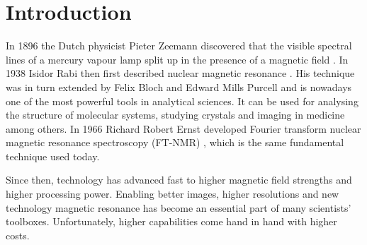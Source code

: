 \setchapterpreamble[u]{\margintoc}
\chapter{Introduction}


In 1896 the Dutch physicist Pieter Zeemann discovered that the visible spectral lines of a mercury vapour lamp split up in the presence of a magnetic field . In 1938 Isidor Rabi then first described nuclear magnetic resonance . His technique was in turn extended by Felix Bloch  and Edward Mills Purcell  and is nowadays one of the most powerful tools in analytical sciences. It can be used for analysing the structure of molecular systems, studying crystals and imaging in medicine among others. In 1966 Richard Robert Ernst developed Fourier transform nuclear magnetic resonance spectroscopy (FT-NMR) , which is the same fundamental technique used today.

Since then, technology has advanced fast to higher magnetic field strengths and higher processing power. Enabling better images, higher resolutions and new technology magnetic resonance has become an essential part of many scientists' toolboxes. Unfortunately, higher capabilities come hand in hand with higher costs.

